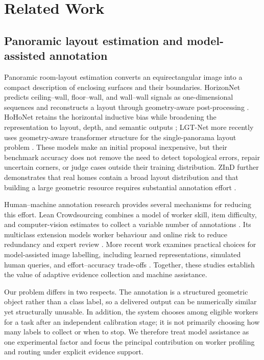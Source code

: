 \section{Related Work}
\label{sec:related}

\subsection{Panoramic layout estimation and model-assisted annotation}

Panoramic room-layout estimation converts an equirectangular image into a compact description of enclosing surfaces and their boundaries. HorizonNet predicts ceiling--wall, floor--wall, and wall--wall signals as one-dimensional sequences and reconstructs a layout through geometry-aware post-processing \cite{sun2019horizonnet}. HoHoNet retains the horizontal inductive bias while broadening the representation to layout, depth, and semantic outputs \cite{sun2021hohonet}; LGT-Net more recently uses geometry-aware transformer structure for the single-panorama layout problem \cite{jiang2022lgtnet}. These models make an initial proposal inexpensive, but their benchmark accuracy does not remove the need to detect topological errors, repair uncertain corners, or judge cases outside their training distribution. ZInD further demonstrates that real homes contain a broad layout distribution and that building a large geometric resource requires substantial annotation effort \cite{cruz2021zind}.

Human--machine annotation research provides several mechanisms for reducing this effort. Lean Crowdsourcing combines a model of worker skill, item difficulty, and computer-vision estimates to collect a variable number of annotations \cite{branson2017lean}. Its multiclass extension models worker behaviour and online risk to reduce redundancy and expert review \cite{vanhorn2018leanmulticlass}. More recent work examines practical choices for model-assisted image labelling, including learned representations, simulated human queries, and effort--accuracy trade-offs \cite{liao2021goodpractices}. Together, these studies establish the value of adaptive evidence collection and machine assistance.

Our problem differs in two respects. The annotation is a structured geometric object rather than a class label, so a delivered output can be numerically similar yet structurally unusable. In addition, the system chooses among eligible workers for a task after an independent calibration stage; it is not primarily choosing how many labels to collect or when to stop. We therefore treat model assistance as one experimental factor and focus the principal contribution on worker profiling and routing under explicit evidence support.

